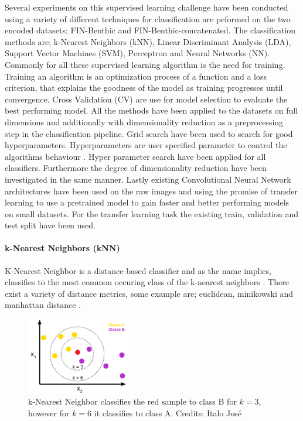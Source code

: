 Several experiments on this supervised learning challenge have been conducted using a variety of different techniques for classification are peformed on the two encoded datasets; FIN-Benthic and FIN-Benthic-concatenated. The classification methods are; k-Nearest Neighbors (kNN), Linear Discriminant Analysis (LDA), Support Vector Machines (SVM), Perceptron and Neural Networks (NN). Commonly for all these supervised learning algorithm is the need for training. Training an algorithm is an optimization process of a function and a loss criterion, that explains the goodness of the model as training progresses until convergence. Cross Validation (CV) are use for model selection to evaluate the best performing model. All the methods have been applied to the datasets on full dimensions and additionally with dimensionality reduction as a preprocessing step in the classification pipeline. Grid search have been used to search for good hyperparameters. Hyperparameters are user specified parameter to control the algorithms behaviour \cite{Goodfellow-et-al-2016}. Hyper parameter search have been applied for all classifiers. Furthermore the degree of dimensionality reduction have been investigated in the same manner. Lastly existing Convolutional Neural Network architectures have been used on the raw images and using the promise of transfer learning to use a pretrained model to gain faster and better performing models on small datasets. For the transfer learning task the existing train, validation and test split have been used.

\paragraph{k-Nearest Neighbors (kNN)}

K-Nearest Neighbor is a distance-based classifier and as the name implies, classifies to the most common occuring class of the k-nearest neighbors \cite{karpathy}. There exist a variety of distance metrics, some example are; euclidean, minikowski and manhattan distance \cite{AIML}. 

\begin{figure}[H]
    \centering
    \includegraphics[width=0.4\textwidth]{figures/knn.png}
    \caption[]{k-Nearest Neighbor classifies the red sample to class B for $k=3$, however for $k=6$ it classifies to class A. Credits: Italo José}
    \label{fig:knn}
\end{figure}

